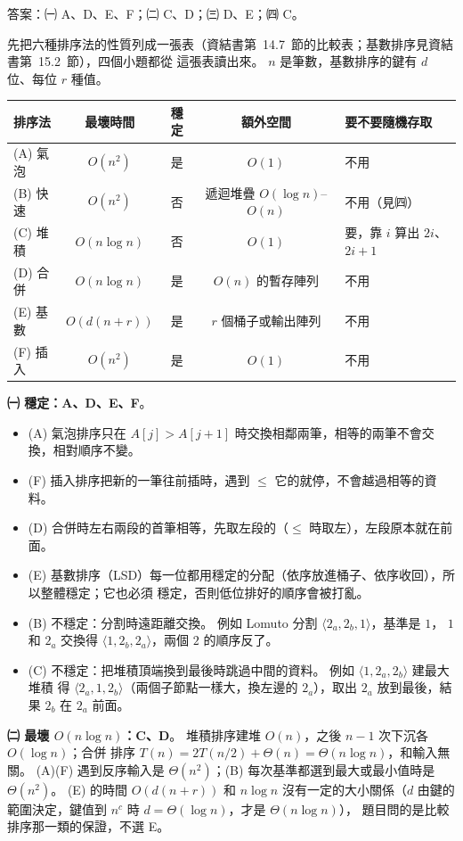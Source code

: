 \begin{pastsoln}
答案：㈠ A、D、E、F；㈡ C、D；㈢ D、E；㈣ C。

先把六種排序法的性質列成一張表（資結書第~14.7~節的比較表；基數排序見資結書第~15.2~節），四個小題都從
這張表讀出來。 $n$ 是筆數，基數排序的鍵有 $d$ 位、每位 $r$ 種值。
\begin{center}
\small
\begin{tabular}{lcccl}
\toprule
排序法 & 最壞時間 & 穩定 & 額外空間 & 要不要隨機存取 \\
\midrule
(A) 氣泡 & $O(n^2)$ & 是 & $O(1)$ & 不用 \\
(B) 快速 & $O(n^2)$ & 否 & 遞迴堆疊 $O(\log n)$--$O(n)$ & 不用（見㈣） \\
(C) 堆積 & $O(n \log n)$ & 否 & $O(1)$ & 要，靠 $i$ 算出 $2i$、$2i + 1$ \\
(D) 合併 & $O(n \log n)$ & 是 & $O(n)$ 的暫存陣列 & 不用 \\
(E) 基數 & $O(d(n + r))$ & 是 & $r$ 個桶子或輸出陣列 & 不用 \\
(F) 插入 & $O(n^2)$ & 是 & $O(1)$ & 不用 \\
\bottomrule
\end{tabular}
\end{center}

\textbf{㈠ 穩定：A、D、E、F}。
\begin{itemize}
\item (A) 氣泡排序只在 $A[j] > A[j+1]$ 時交換相鄰兩筆，相等的兩筆不會交換，相對順序不變。
\item (F) 插入排序把新的一筆往前插時，遇到 $\le$ 它的就停，不會越過相等的資料。
\item (D) 合併時左右兩段的首筆相等，先取左段的（$\le$ 時取左），左段原本就在前面。
\item (E) 基數排序（LSD）每一位都用穩定的分配（依序放進桶子、依序收回），所以整體穩定；它也必須
穩定，否則低位排好的順序會被打亂。
\item (B) 不穩定：分割時遠距離交換。 例如 Lomuto 分割 $\langle 2_a, 2_b, 1\rangle$，基準是 $1$，
$1$ 和 $2_a$ 交換得 $\langle 1, 2_b, 2_a\rangle$，兩個 $2$ 的順序反了。
\item (C) 不穩定：把堆積頂端換到最後時跳過中間的資料。 例如 $\langle 1, 2_a, 2_b\rangle$ 建最大堆積
得 $\langle 2_a, 1, 2_b\rangle$（兩個子節點一樣大，換左邊的 $2_a$），取出 $2_a$ 放到最後，結果
$2_b$ 在 $2_a$ 前面。
\end{itemize}

\textbf{㈡ 最壞 $O(n \log n)$：C、D}。 堆積排序建堆 $O(n)$，之後 $n - 1$ 次下沉各 $O(\log n)$；合併
排序 $T(n) = 2T(n/2) + \Theta(n) = \Theta(n \log n)$，和輸入無關。 (A)(F) 遇到反序輸入是
$\Theta(n^2)$；(B) 每次基準都選到最大或最小值時是 $\Theta(n^2)$。 (E) 的時間 $O(d(n + r))$ 和 $n \log n$
沒有一定的大小關係（$d$ 由鍵的範圍決定，鍵值到 $n^c$ 時 $d = \Theta(\log n)$，才是 $\Theta(n \log n)$），
題目問的是比較排序那一類的保證，不選 E。


\end{pastsoln}
